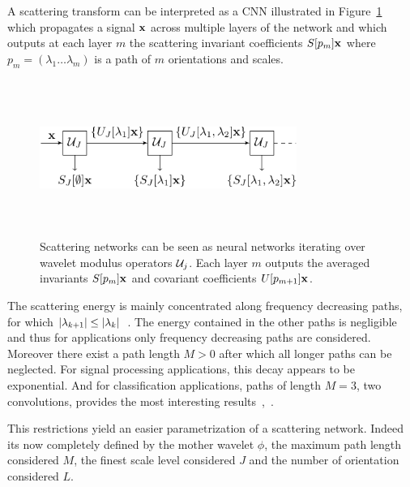 \documentclass{article}
\begin{document}
    A scattering transform can be interpreted as a CNN illustrated in Figure~\ref{fig:SCN 1}~\citep{Deep Roto-Translation Scattering for Object Classification} which propagates a signal ${\bf x}$ across multiple layers of the network and which outputs at each layer $m$ the scattering invariant coefficients $S[p_{m}]{\bf x}$ where $p_{m}=(\lambda_{1} \dots \lambda_{m})$ is a path of $m$ orientations and scales.
    
    \begin{figure}
      \begin{center}
        \includegraphics[width=3.3in, height=2in, keepaspectratio]{scatnet_crop.pdf}
        \caption[Scattering convolution network.]{\centering  Scattering networks can be seen as neural networks iterating over wavelet  modulus  operators $\mathcal{U}_{j}$. Each layer $m$ outputs the averaged  invariants $S[p_{m}]{\bf x}$ and covariant coefficients $U[p_{m+1}]{\bf x}$.}
        \label{fig:SCN 1}
      \end{center}
      \vspace{-15pt}
    \end{figure}
    
    The scattering energy is mainly concentrated along frequency decreasing paths, \ie for which $\left| \lambda_{k+1} \right| \leq \left| \lambda_{k} \right|$~\citep{mallat gis}. The energy contained in the other paths is negligible and thus for applications only frequency decreasing paths are considered. Moreover there exist a path length $M > 0$ after which all longer paths can be neglected. For signal processing applications, this decay appears to be exponential. And for classification applications, paths of length $M = 3$, \ie two convolutions, provides the most interesting results~\citep{anden2011multiscale},~\citep{bruna2010classification}.
      
    This restrictions yield an easier parametrization of a scattering network. Indeed its now completely defined by the mother wavelet $\phi$, the maximum path length considered $M$, the finest scale level considered $J$ and the number of orientation considered $L$.
      
\end{document}
